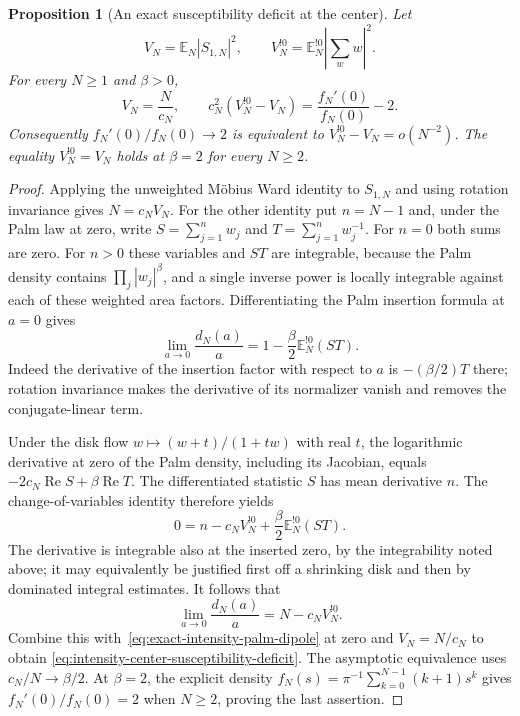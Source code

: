\documentclass[11pt,a4paper]{article}
\numberwithin{equation}{section}
\newtheorem{proposition}[theorem]{Proposition}
\theoremstyle{definition}
\theoremstyle{remark}
\newcommand{\E}{\mathbb E}
\begin{document}
\begin{proposition}[An exact susceptibility deficit at the center]
\label{prop:intensity-center-susceptibility-deficit}
Let
\[
 V_N=\E_N|S_{1,N}|^2,\qquad
 V_N^{!0}=\E_N^{!0}\left|\sum_w w\right|^2.
\]
For every $N\ge1$ and $\beta>0$,
\begin{equation}
 V_N=\frac N{c_N},\qquad
 c_N^2(V_N^{!0}-V_N)=\frac{f_N'(0)}{f_N(0)}-2.
 \label{eq:intensity-center-susceptibility-deficit}
\end{equation}
Consequently $f_N'(0)/f_N(0)\to2$ is equivalent to
$V_N^{!0}-V_N=o(N^{-2})$. The equality $V_N^{!0}=V_N$ holds
at $\beta=2$ for every $N\ge2$.
\end{proposition}

\begin{proof}
Applying the unweighted M\"obius Ward identity to $S_{1,N}$ and
using rotation invariance gives $N=c_NV_N$.
For the other identity put $n=N-1$ and, under the Palm law at zero,
write $S=\sum_{j=1}^n w_j$ and $T=\sum_{j=1}^n w_j^{-1}$.
For $n=0$ both sums are zero. For $n>0$ these variables and $ST$
are integrable, because the Palm density contains
$\prod_j|w_j|^\beta$, and a single inverse power is locally
integrable against each of these weighted area factors.
Differentiating the Palm insertion formula at $a=0$ gives
\[
 \lim_{a\to0}\frac{d_N(a)}a=1-\frac\beta2\E_N^{!0}(ST).
\]
Indeed the derivative of the insertion factor with respect to $a$
is $-(\beta/2)T$ there; rotation invariance makes the derivative
of its normalizer vanish and removes the conjugate-linear term.

Under the disk flow $w\mapsto (w+t)/(1+tw)$ with real $t$,
the logarithmic derivative at zero of the Palm density, including
its Jacobian, equals
$-2c_N\operatorname{Re}S+\beta\operatorname{Re}T$.
The differentiated statistic $S$ has mean derivative $n$.
The change-of-variables identity therefore yields
\[
 0=n-c_NV_N^{!0}+\frac\beta2\E_N^{!0}(ST).
\]
The derivative is integrable also at the inserted zero, by the
integrability noted above; it may equivalently be justified first
off a shrinking disk and then by dominated integral estimates.
It follows that
\[
 \lim_{a\to0}\frac{d_N(a)}a=N-c_NV_N^{!0}.
\]
Combine this with~\eqref{eq:exact-intensity-palm-dipole} at zero
and $V_N=N/c_N$ to obtain
\eqref{eq:intensity-center-susceptibility-deficit}.
The asymptotic equivalence uses $c_N/N\to\beta/2$.
At $\beta=2$, the explicit density
$f_N(s)=\pi^{-1}\sum_{k=0}^{N-1}(k+1)s^k$ gives
$f_N'(0)/f_N(0)=2$ when $N\ge2$, proving the last assertion.
\end{proof}
\end{document}
